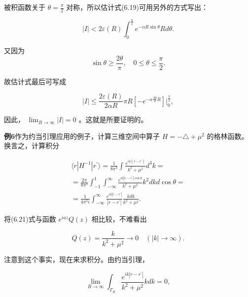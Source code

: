被积函数关于 $\theta = \frac{\pi}{2}$ 对称，所以估计式(6.19)可用另外的方式写出：

\begin{equation*}
\mid I \mid <   2 \varepsilon (R) \int_ {0} ^ {\frac {\pi}{2}} e ^ {- \alpha R \sin \theta} R d \theta .
\end{equation*}

又因为
\begin{equation*}
\sin \theta \geqslant \frac {2 \theta}{\pi}, \quad 0 \leqslant \theta \leqslant \frac {\pi}{2}.
\end{equation*}

故估计式最后可写成

\begin{equation*}
| I | \leqslant \frac {2 \varepsilon (R)}{2 \alpha R} \pi R [ - e ^ {- \alpha \frac {2 \theta}{\pi} R} ] \Bigg | _ {0} ^ {\frac {\pi}{2}},\tag{6.20}
\end{equation*}

因此， $\lim_{R\to \infty}|I| = 0$ 。这就是所要证明的。

\textbf{例6}\quad 作为约当引理应用的例子，计算三维空间中算子 $H = -\triangle + \mu^2$ 的格林函数。换言之，计算积分

\begin{equation*}
\begin{array}{l} \langle r | H ^ {- 1} | r ^ {\prime} \rangle = \frac {1}{8 \pi^ {3}} \int \frac {e ^ {i k (r - r ^ {\prime})}}{k ^ {2} + \mu^ {2}} d ^ {3} k = \\ = \frac {2 \pi}{8 \pi^ {3}} \int_ {- 1} ^ {1} \int_ {- \infty} ^ {\infty} \frac {e ^ {i k | r - r ^ {\prime} | \cos \theta}}{k ^ {2} + \mu^ {2}} k ^ {2} d k d \cos \theta = \\ = \frac {1}{4 \pi^ {2} i} \int_ {- \infty} ^ {\infty} \frac {e ^ {i k | r - r ^ {\prime} |}}{| r - r ^ {\prime} |} \frac {k d k}{k ^ {2} + \mu^ {2}}. \end{array} \tag{6.21}
\end{equation*}

将(6.21)式与函数 $e^{iaz}Q(z)$ 相比较，不难看出

\begin{equation*}
Q (z) = \frac {k}{k ^ {2} + \mu^ {2}} \rightarrow 0 \quad (\mid k \mid \rightarrow \infty).
\end{equation*}

注意到这个事实，现在来求积分。由约当引理，

\begin{equation*}
\lim _ {R \rightarrow \infty} \int_ {\Gamma_ {R}} \frac {e ^ {i k | r - r ^ {\prime} |}}{k ^ {2} + \mu^ {2}} k d k = 0,
\end{equation*}

